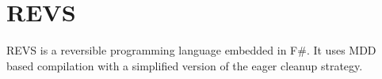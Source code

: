 \chapter{REVS}

REVS is a reversible programming language embedded in F\#.  It uses MDD based
compilation with a simplified version of the eager cleanup strategy.
